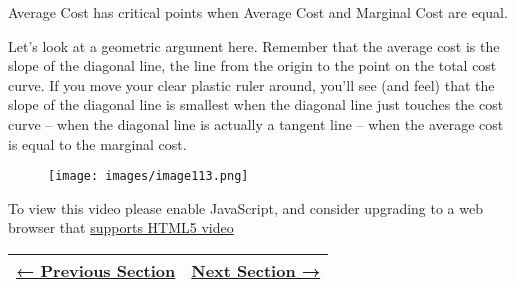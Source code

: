 Average Cost has critical points when Average Cost and Marginal Cost are
equal.

Let's look at a geometric argument here. Remember that the average cost
is the slope of the diagonal line, the line from the origin to the point
on the total cost curve. If you move your clear plastic ruler around,
you'll see (and feel) that the slope of the diagonal line is smallest
when the diagonal line just touches the cost curve -- when the diagonal
line is actually a tangent line -- when the average cost is equal to the
marginal cost.

\begin{figure}
\centering
\texttt{[image: images/image113.png]}
\caption{}
\end{figure}

To view this video please enable JavaScript, and consider upgrading to a
web browser that \href{http://videojs.com/html5-video-support/}{supports
HTML5 video}

\begin{longtable}[]{@{}ll@{}}
\toprule
\endhead
\href{section2-8.php}{← Previous Section} & \href{section2-10.php}{Next
Section →}\tabularnewline
\bottomrule
\end{longtable}
